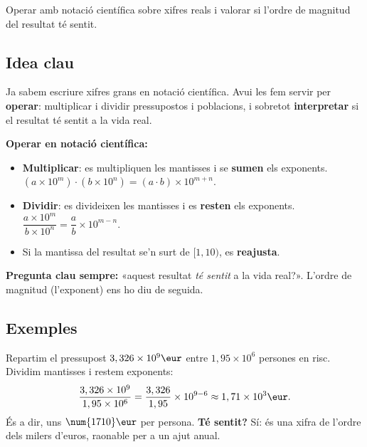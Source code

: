 %
{Operar amb notació científica sobre xifres reals i valorar si l'ordre de magnitud del resultat té sentit.}

\subsection{Idea clau}

Ja sabem escriure xifres grans en notació científica. Avui les fem servir per
\textbf{operar}: multiplicar i dividir pressupostos i poblacions, i sobretot
\textbf{interpretar} si el resultat té sentit a la vida real.

\begin{idea}
\textbf{Operar en notació científica:}
\begin{itemize}[leftmargin=1.4em, itemsep=2pt]
  \item \textbf{Multiplicar}: es multipliquen les mantisses i se \textbf{sumen} els
        exponents. \quad $(a\times 10^{m})\cdot(b\times 10^{n})=(a\cdot b)\times 10^{m+n}$.
  \item \textbf{Dividir}: es divideixen les mantisses i es \textbf{resten} els
        exponents. \quad $\dfrac{a\times 10^{m}}{b\times 10^{n}}=\dfrac{a}{b}\times 10^{m-n}$.
  \item Si la mantissa del resultat se'n surt de $[1,10)$, es \textbf{reajusta}.
\end{itemize}
\textbf{Pregunta clau sempre:} «aquest resultat \emph{té sentit} a la vida real?».
L'ordre de magnitud (l'exponent) ens ho diu de seguida.
\end{idea}

\subsection{Exemples}

\begin{exemple}
Repartim el pressupost $3,326\times 10^{9}\eur$ entre $1,95\times 10^{6}$ persones en
risc. Dividim mantisses i restem exponents:
\[
\frac{3,326\times 10^{9}}{1,95\times 10^{6}}
=\frac{3,326}{1,95}\times 10^{9-6}
\approx 1,71\times 10^{3}\eur.
\]
És a dir, uns $\num{1710}\eur$ per persona. \textbf{Té sentit?} Sí: és una xifra de
l'ordre dels milers d'euros, raonable per a un ajut anual.
\end{exemple}

